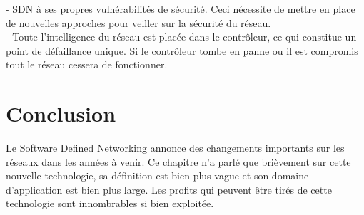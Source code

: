\noindent- SDN à ses propres vulnérabilités de sécurité. Ceci nécessite de mettre en place de nouvelles approches pour veiller sur la sécurité du réseau.\\

\noindent- Toute l'intelligence du réseau est placée dans le contrôleur, ce qui constitue un point de défaillance unique. Si le contrôleur tombe en panne ou il est compromis tout le réseau cessera de fonctionner.

\section{Conclusion}
Le Software Defined Networking annonce des changements importants sur les réseaux dans les années à venir. Ce chapitre n'a parlé que brièvement sur cette nouvelle technologie, sa définition est bien plus vague et son domaine d'application est bien plus large. Les profits qui peuvent être tirés de cette technologie sont innombrables si bien exploitée.
